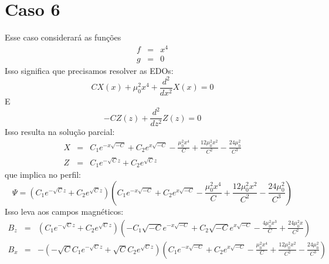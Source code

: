 \documentclass[12pt]{article}
\def\be{\begin{equation}}
\def\ee{\end{equation}}
\def\bea{\begin{eqnarray*}}
\def\eea{\end{eqnarray*}}
\theoremstyle{definition}
\numberwithin{equation}{section}
\begin{document}
        \section{Caso 6}
        Esse caso considerará as funções
        \bea
            f &=& x^{4} \\
            g &=& 0
        \eea
        Isso significa que precisamos resolver as EDOs:
        \be
            C X{\left(x \right)} + \mu_{0}^{2} x^{4} + \frac{d^{2}}{d x^{2}} X{\left(x \right)} = 0
        \ee
        E
        \be
            - C Z{\left(z \right)} + \frac{d^{2}}{d z^{2}} Z{\left(z \right)} = 0
        \ee
        Isso resulta na solução parcial:
        \bea
            X &=& C_{1} e^{- x \sqrt{- C}} + C_{2} e^{x \sqrt{- C}} - \frac{\mu_{0}^{2} x^{4}}{C} + \frac{12 \mu_{0}^{2} x^{2}}{C^{2}} - \frac{24 \mu_{0}^{2}}{C^{3}} \\
            Z &=& C_{1} e^{- \sqrt{C} z} + C_{2} e^{\sqrt{C} z}
        \eea
        que implica no perfil:
        \be
            \Psi = \left(C_{1} e^{- \sqrt{C} z} + C_{2} e^{\sqrt{C} z}\right) \left(C_{1} e^{- x \sqrt{- C}} + C_{2} e^{x \sqrt{- C}} - \frac{\mu_{0}^{2} x^{4}}{C} + \frac{12 \mu_{0}^{2} x^{2}}{C^{2}} - \frac{24 \mu_{0}^{2}}{C^{3}}\right)
        \ee
        Isso leva aos campos magnéticos:
        \bea
            B_z &=& \left(C_{1} e^{- \sqrt{C} z} + C_{2} e^{\sqrt{C} z}\right) \left(- C_{1} \sqrt{- C} e^{- x \sqrt{- C}} + C_{2} \sqrt{- C} e^{x \sqrt{- C}} - \frac{4 \mu_{0}^{2} x^{3}}{C} + \frac{24 \mu_{0}^{2} x}{C^{2}}\right)\\
            B_x &=& - \left(- \sqrt{C} C_{1} e^{- \sqrt{C} z} + \sqrt{C} C_{2} e^{\sqrt{C} z}\right) \left(C_{1} e^{- x \sqrt{- C}} + C_{2} e^{x \sqrt{- C}} - \frac{\mu_{0}^{2} x^{4}}{C} + \frac{12 \mu_{0}^{2} x^{2}}{C^{2}} - \frac{24 \mu_{0}^{2}}{C^{3}}\right)
        \eea
        
\end{document}
